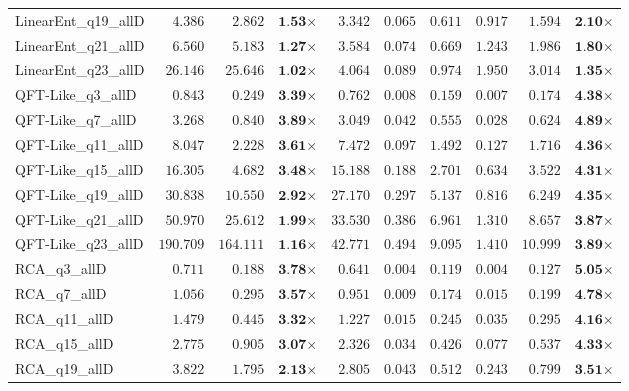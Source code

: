 \begin{table*}[t]
{\begin{tabular}{| l || r r c || r r r r r c |}
LinearEnt\_q19\_allD & $4.386$ & $2.862$ & $\textbf{1.53}$$\times$ & $3.342$ & $0.065$ & $0.611$ & $0.917$ & $1.594$ & $\textbf{2.10}$$\times$ \\
LinearEnt\_q21\_allD & $6.560$ & $5.183$ & $\textbf{1.27}$$\times$ & $3.584$ & $0.074$ & $0.669$ & $1.243$ & $1.986$ & $\textbf{1.80}$$\times$ \\
LinearEnt\_q23\_allD & $26.146$ & $25.646$ & $\textbf{1.02}$$\times$ & $4.064$ & $0.089$ & $0.974$ & $1.950$ & $3.014$ & $\textbf{1.35}$$\times$ \\
QFT-Like\_q3\_allD & $0.843$ & $0.249$ & $\textbf{3.39}$$\times$ & $0.762$ & $0.008$ & $0.159$ & $0.007$ & $0.174$ & $\textbf{4.38}$$\times$ \\
QFT-Like\_q7\_allD & $3.268$ & $0.840$ & $\textbf{3.89}$$\times$ & $3.049$ & $0.042$ & $0.555$ & $0.028$ & $0.624$ & $\textbf{4.89}$$\times$ \\
QFT-Like\_q11\_allD & $8.047$ & $2.228$ & $\textbf{3.61}$$\times$ & $7.472$ & $0.097$ & $1.492$ & $0.127$ & $1.716$ & $\textbf{4.36}$$\times$ \\
QFT-Like\_q15\_allD & $16.305$ & $4.682$ & $\textbf{3.48}$$\times$ & $15.188$ & $0.188$ & $2.701$ & $0.634$ & $3.522$ & $\textbf{4.31}$$\times$ \\
QFT-Like\_q19\_allD & $30.838$ & $10.550$ & $\textbf{2.92}$$\times$ & $27.170$ & $0.297$ & $5.137$ & $0.816$ & $6.249$ & $\textbf{4.35}$$\times$ \\
QFT-Like\_q21\_allD & $50.970$ & $25.612$ & $\textbf{1.99}$$\times$ & $33.530$ & $0.386$ & $6.961$ & $1.310$ & $8.657$ & $\textbf{3.87}$$\times$ \\
QFT-Like\_q23\_allD & $190.709$ & $164.111$ & $\textbf{1.16}$$\times$ & $42.771$ & $0.494$ & $9.095$ & $1.410$ & $10.999$ & $\textbf{3.89}$$\times$ \\
RCA\_q3\_allD & $0.711$ & $0.188$ & $\textbf{3.78}$$\times$ & $0.641$ & $0.004$ & $0.119$ & $0.004$ & $0.127$ & $\textbf{5.05}$$\times$ \\
RCA\_q7\_allD & $1.056$ & $0.295$ & $\textbf{3.57}$$\times$ & $0.951$ & $0.009$ & $0.174$ & $0.015$ & $0.199$ & $\textbf{4.78}$$\times$ \\
RCA\_q11\_allD & $1.479$ & $0.445$ & $\textbf{3.32}$$\times$ & $1.227$ & $0.015$ & $0.245$ & $0.035$ & $0.295$ & $\textbf{4.16}$$\times$ \\
RCA\_q15\_allD & $2.775$ & $0.905$ & $\textbf{3.07}$$\times$ & $2.326$ & $0.034$ & $0.426$ & $0.077$ & $0.537$ & $\textbf{4.33}$$\times$ \\
RCA\_q19\_allD & $3.822$ & $1.795$ & $\textbf{2.13}$$\times$ & $2.805$ & $0.043$ & $0.512$ & $0.243$ & $0.799$ & $\textbf{3.51}$$\times$ \\

\end{tabular}}
\end{table*}
